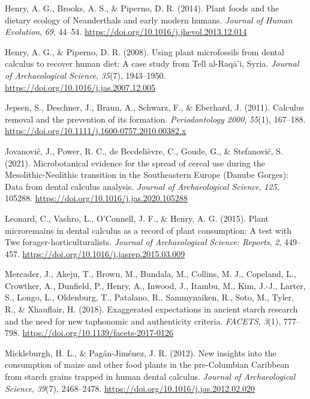 \documentclass[
  letterpaper,
]{book}
\newlength{\cslhangindent}
\newlength{\cslentryspacingunit} %
\newenvironment{CSLReferences}[2] %
 {%
  \setlength{\parindent}{0pt}
  \ifodd #1
  \let\oldpar\par
  \def\par{\hangindent=\cslhangindent\oldpar}
  \fi
  \setlength{\parskip}{#2\cslentryspacingunit}
 }%
 {}
\begin{document}
\begin{CSLReferences}{1}{0}
\leavevmode{}%
Henry, A. G., Brooks, A. S., \& Piperno, D. R. (2014). Plant foods and
the dietary ecology of {Neanderthals} and early modern humans.
\emph{Journal of Human Evolution}, \emph{69}, 44--54.
\url{https://doi.org/10.1016/j.jhevol.2013.12.014}

\leavevmode{}%
Henry, A. G., \& Piperno, D. R. (2008). Using plant microfossils from
dental calculus to recover human diet: A case study from {Tell}
al-{Raqā}'i, {Syria}. \emph{Journal of Archaeological Science},
\emph{35}(7), 1943--1950.
\url{https://doi.org/10.1016/j.jas.2007.12.005}

\leavevmode{}%
Jepsen, S., Deschner, J., Braun, A., Schwarz, F., \& Eberhard, J.
(2011). Calculus removal and the prevention of its formation.
\emph{Periodontology 2000}, \emph{55}(1), 167--188.
\url{https://doi.org/10.1111/j.1600-0757.2010.00382.x}

\leavevmode{}%
Jovanović, J., Power, R. C., de Becdelièvre, C., Goude, G., \&
Stefanović, S. (2021). Microbotanical evidence for the spread of cereal
use during the {Mesolithic-Neolithic} transition in the {Southeastern
Europe} ({Danube Gorges}): {Data} from dental calculus analysis.
\emph{Journal of Archaeological Science}, \emph{125}, 105288.
\url{https://doi.org/10.1016/j.jas.2020.105288}

\leavevmode{}%
Leonard, C., Vashro, L., O'Connell, J. F., \& Henry, A. G. (2015). Plant
microremains in dental calculus as a record of plant consumption: {A}
test with {Twe} forager-horticulturalists. \emph{Journal of
Archaeological Science: Reports}, \emph{2}, 449--457.
\url{https://doi.org/10.1016/j.jasrep.2015.03.009}

\leavevmode{}%
Mercader, J., Akeju, T., Brown, M., Bundala, M., Collins, M. J.,
Copeland, L., Crowther, A., Dunfield, P., Henry, A., Inwood, J., Itambu,
M., Kim, J.-J., Larter, S., Longo, L., Oldenburg, T., Patalano, R.,
Sammynaiken, R., Soto, M., Tyler, R., \& Xhauflair, H. (2018).
Exaggerated expectations in ancient starch research and the need for new
taphonomic and authenticity criteria. \emph{FACETS}, \emph{3}(1),
777--798. \url{https://doi.org/10.1139/facets-2017-0126}

\leavevmode{}%
Mickleburgh, H. L., \& Pagán-Jiménez, J. R. (2012). New insights into
the consumption of maize and other food plants in the pre-{Columbian
Caribbean} from starch grains trapped in human dental calculus.
\emph{Journal of Archaeological Science}, \emph{39}(7), 2468--2478.
\url{https://doi.org/10.1016/j.jas.2012.02.020}


\end{CSLReferences}
\end{document}
